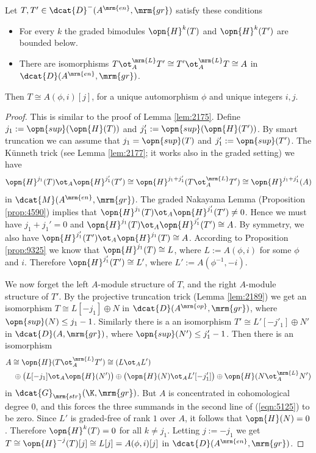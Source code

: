 \begin{lem} \label{lem:3916}
Let 
$T, T' \in \dcat{D}^-(A^{\mrm{en}}, \mrm{gr})$ 
satisfy these conditions\tup{:}
\begin{itemize}
\item For every $k$ the graded bimodules $\opn{H}^k(T)$ and $\opn{H}^k(T')$
are bounded below. 

\item There are isomorphisms
$T \ot^{\mrm{L}}_{A} T' \cong T' \ot^{\mrm{L}}_{A} T \cong A$
in $\dcat{D}(A^{\mrm{en}}, \mrm{gr})$.
\end{itemize}
Then $T \cong A(\phi, i)[j]$, for a unique automorphism $\phi$ and unique 
integers $i, j$. 
\end{lem}

\begin{proof}
This is similar to the proof of Lemma \ref{lem:2175}. Define 
$j_1 := \opn{sup}(\opn{H}(T))$ and 
$j'_1 := \opn{sup}(\opn{H}(T'))$. 
By smart truncation we can assume that 
$j_1 = \opn{sup}(T)$ and $j'_1 := \opn{sup}(T')$.
The K\"unneth trick (see Lemma \ref{lem:2177}; it works also in the 
graded setting) we have 
\[ \opn{H}^{j_1}(T) \ot_A \opn{H}^{j_1'}(T') \cong 
\opn{H}^{j_1 + j'_1}(T \ot^{\mrm{L}}_{A} T') \cong \opn{H}^{j_1 + j'_1}(A) \]
in $\dcat{M}(A^{\mrm{en}}, \mrm{gr})$. 
The graded Nakayama Lemma (Proposition \ref{prop:4590}) implies that
$\opn{H}^{j_1}(T) \ot_A \opn{H}^{j'_1}(T') \neq 0$.
Hence we must have $j_1 + j_1' = 0$ and 
$\opn{H}^{j_1}(T) \ot_A \opn{H}^{j'_1}(T') \cong A$.
By symmetry, we also have 
$\opn{H}^{j'_1}(T') \ot_A \opn{H}^{j_1}(T) \cong A$.
According to Proposition \ref{prop:9325} we know that 
$\opn{H}^{j_1}(T) \cong L$, where $L := A(\phi, i)$ for some $\phi$ and $i$. 
Therefore $\opn{H}^{j'_1}(T') \cong L'$,
where $L' := A(\phi^{-1}, -i)$. 

We now forget the left $A$-module structure of $T$, and the right $A$-module 
structure of $T'$. By the projective truncation trick (Lemma \ref{lem:2189})
we get an isomorphism $T \cong L[-j_1] \oplus N$ in 
$\dcat{D}(A^{\mrm{op}}, \mrm{gr})$, where 
$\opn{sup}(N) \leq j_1 - 1$. Similarly there is a an isomorphism 
$T' \cong L'[-j'_1] \oplus N'$ in 
$\dcat{D}(A, \mrm{gr})$, where $\opn{sup}(N') \leq j'_1 - 1$.
Then there is an isomorphism 
\begin{equation} \label{eqn:5125}
\begin{aligned}
& A \cong \opn{H}(T \ot^{\mrm{L}}_{A} T') \cong (L \ot_{A} L') 
\\ 
& \quad 
\oplus \bigl( L[-j_1] \ot_{A} \opn{H}(N') \bigr)
\oplus \bigl( \opn{H}(N) \ot_{A} L'[-j'_1] \bigr)  \oplus 
\opn{H}(N \ot^{\mrm{L}}_{A} N')
\end{aligned} 
\end{equation}
in $\dcat{G}_{\mrm{str}}(\K, \mrm{gr})$. But $A$ is concentrated in 
cohomological degree $0$, and this forces the three summands 
in the second line of (\ref{eqn:5125}) to be 
zero. Since $L'$ is graded-free of rank $1$ over $A$, it follows that 
$\opn{H}(N) = 0$. Therefore $\opn{H}^{k}(T) = 0$ for all $k \neq j_1$.
Letting $j := -j_1$ we get 
$T \cong \opn{H}^{-j}(T)[j] \cong L[j] = A(\phi, i)[j]$
in $\dcat{D}(A^{\mrm{en}}, \mrm{gr})$. 
\end{proof}

